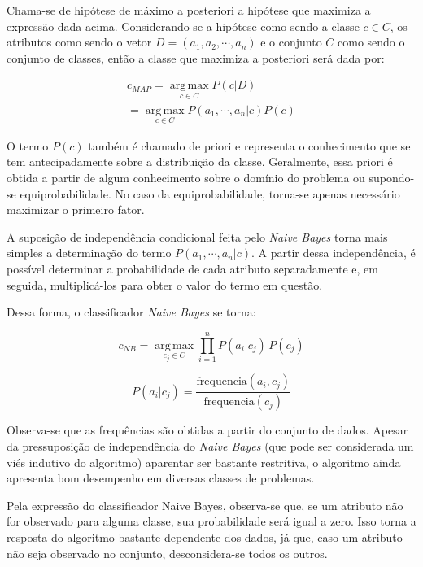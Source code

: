 \documentclass{article}
\begin{document}
Chama-se de hipótese de máximo a posteriori a hipótese que maximiza a expressão dada acima. Considerando-se a hipótese como sendo a classe $c \in C$, os atributos como sendo o vetor $D = (a_1,a_2,\cdots,a_n)$ e o conjunto $C$ como sendo o conjunto de classes, então a classe que maximiza a posteriori será dada por:

\begin{multline}
c_{MAP} = \operatorname*{arg\,max}_{c \in C} P(c|D) \\
= \operatorname*{arg\,max}_{c \in C} P(a_1,\cdots,a_n|c) P(c)
\end{multline}

O termo $P(c)$ também é chamado de priori e representa o conhecimento que se tem antecipadamente sobre a distribuição da classe. Geralmente, essa priori é obtida a partir de algum conhecimento sobre o domínio do problema ou supondo-se equiprobabilidade. No caso da equiprobabilidade, torna-se apenas necessário maximizar o primeiro fator.

A suposição de independência condicional feita pelo {\it Naive Bayes} torna mais simples a determinação do termo $P(a_1,\cdots,a_n|c)$. A partir dessa independência, é possível determinar a probabilidade de cada atributo separadamente e, em seguida, multiplicá-los para obter o valor do termo em questão.

Dessa forma, o classificador {\it Naive Bayes} se torna:

\begin{equation}
c_{NB} = \operatorname*{arg\,max}_{c_j \in C} \prod_{i=1}^n P(a_i|c_j) \, P(c_j)
\end{equation}

\begin{equation}
P(a_i|c_j) = \frac{\mathrm{frequencia}(a_i,c_j)}{\mathrm{frequencia}(c_j)}
\end{equation}

Observa-se que as frequências são obtidas a partir do conjunto de dados. Apesar da pressuposição de independência do {\it Naive Bayes} (que pode ser considerada um viés indutivo do algoritmo) aparentar ser bastante restritiva, o algoritmo ainda apresenta bom desempenho em diversas classes de problemas.

Pela expressão do classificador Naive Bayes, observa-se que, se um atributo não for observado para alguma classe, sua probabilidade será igual a zero. Isso torna a resposta do algoritmo bastante dependente dos dados, já que, caso um atributo não seja observado no conjunto, desconsidera-se todos os outros.
\end{document}
